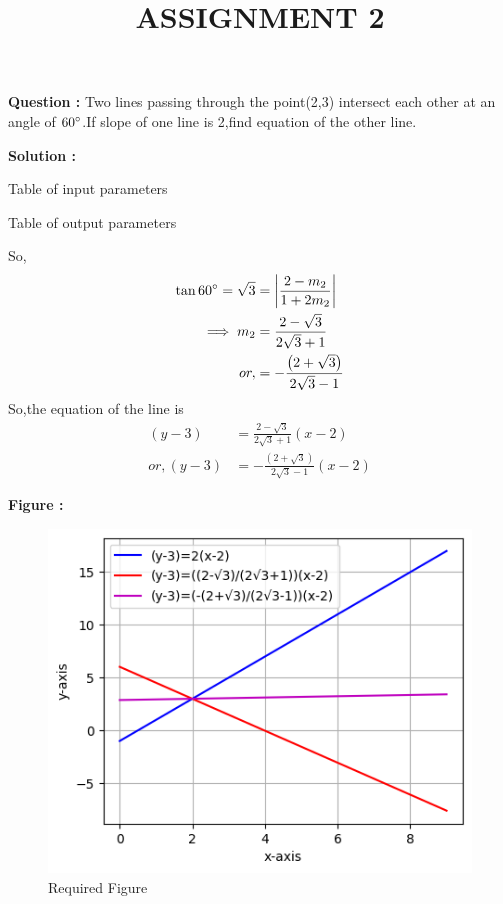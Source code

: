 \documentclass[12pt]{article}
\providecommand{\abs}[1]{\ensuremath{\left|#1\right|}}
\providecommand{\brak}[1]{\ensuremath{\left(#1\right)}}
\begin{document}
\title{\textbf{ASSIGNMENT 2}}
\date{}
\maketitle
\textbf{Question :} Two lines passing through the point(2,3) intersect each other at an angle of $60\degree$.If slope of one line is 2,find equation of the other line.


\textbf{Solution :}
\begin{table}[H]
    \centering
    
   \caption{Table of input parameters}
    \label{tab:tab:1}
\end{table}
\begin{table}[H]
    \centering
    
    \caption{Table of output parameters}
    \label{tab:tab:2}
\end{table}
So,
\begin{align}
    \tan{60\degree}=\sqrt{3}&=\abs{\frac{2-m_2}{1+2m_2}}\\
\implies m_2&=\frac{2-\sqrt{3}}{2\sqrt{3}+1}\\
or,&=-\frac{\brak{2+\sqrt{3}}}{2\sqrt{3}-1}
\end{align}
So,the equation of the line is
\begin{align}
\brak{y-3}&=\frac{2-\sqrt{3}}{2\sqrt{3}+1}\brak{x-2}\\
or,\brak{y-3}&=-\frac{\brak{2+\sqrt{3}}}{2\sqrt{3}-1}\brak{x-2}
\end{align}

\textbf{Figure :}                               
\begin{figure}[H]                            
	\centering                        
	\includegraphics[width=\columnwidth]{fig/asgnt.png}                          
	\caption{Required Figure}
	\label{fig:fig:1}
\end{figure}
\end{document}
